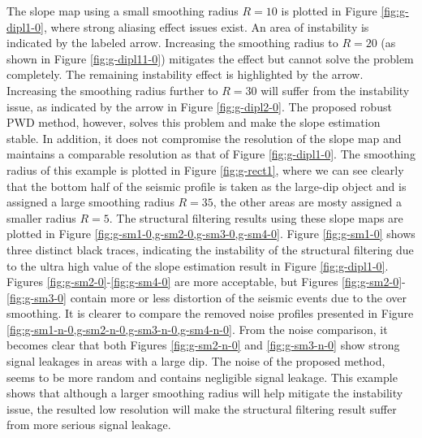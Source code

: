 The slope map using a small smoothing radius $R=10$ is plotted in Figure \ref{fig:g-dipl1-0}, where strong aliasing effect issues exist. An area of instability is indicated by the labeled arrow. Increasing the smoothing radius to $R=20$ (as shown in Figure \ref{fig:g-dipl11-0}) mitigates the effect but cannot solve the problem completely. The remaining instability effect is highlighted by the arrow. Increasing the smoothing radius further to $R=30$ will suffer from the instability issue, as indicated by the arrow in Figure \ref{fig:g-dipl2-0}. The proposed robust PWD method, however, solves this problem and make the slope estimation stable. In addition, it does not compromise the resolution of the slope map and maintains a comparable resolution as that of Figure \ref{fig:g-dipl1-0}. The  smoothing radius of this example is plotted in Figure \ref{fig:g-rect1}, where we can see clearly that the bottom half of the seismic profile is taken as the large-dip object and is assigned a large smoothing radius $R=35$, the other areas are mosty assigned a smaller radius $R=5$.  The structural filtering results using these slope maps are plotted in Figure \ref{fig:g-sm1-0,g-sm2-0,g-sm3-0,g-sm4-0}. Figure \ref{fig:g-sm1-0} shows three distinct black traces, indicating the instability of the structural filtering due to the ultra high value of the slope estimation result in Figure \ref{fig:g-dipl1-0}. Figures \ref{fig:g-sm2-0}-\ref{fig:g-sm4-0} are more acceptable, but Figures \ref{fig:g-sm2-0}-\ref{fig:g-sm3-0} contain more or less distortion of the seismic events due to the over smoothing. It is clearer to compare the removed noise profiles presented in Figure \ref{fig:g-sm1-n-0,g-sm2-n-0,g-sm3-n-0,g-sm4-n-0}. From the noise comparison, it becomes clear that both Figures \ref{fig:g-sm2-n-0} and \ref{fig:g-sm3-n-0} show strong signal leakages \cite{yangkang2015ortho} in areas with a large dip. The noise of the proposed method, seems to be more random and contains negligible signal leakage. This example shows that although a larger smoothing radius will help mitigate the instability issue, the resulted low resolution will make the structural filtering result suffer from more serious signal leakage. 


